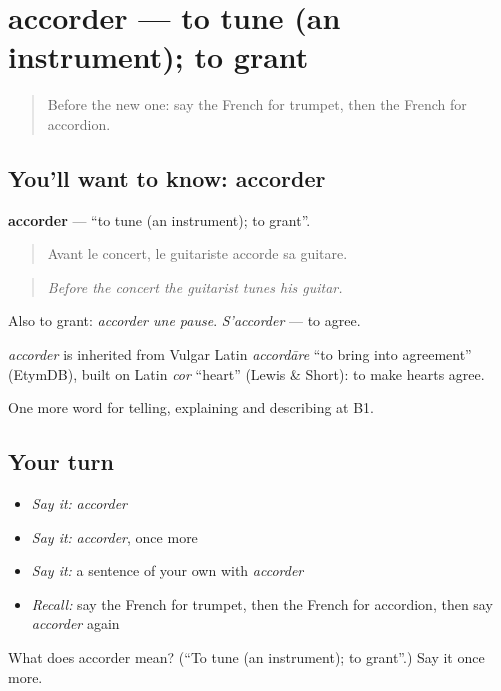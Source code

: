 \section[accorder]{accorder — to tune (an instrument); to grant}

\label{lesson:FR-C511-accorder}



\begin{quote}
Before the new one: say the French for trumpet, then the French for accordion.
\end{quote}

\subsection*{You'll want to know: accorder}
\textbf{accorder} — \textquotedblleft{}to tune (an instrument); to grant\textquotedblright{}.

\begin{quote}
Avant le concert, le guitariste accorde sa guitare.
\end{quote}

\begin{quote}
\emph{Before the concert the guitarist tunes his guitar.}
\end{quote}

Also to grant: \emph{accorder une pause}. \emph{S'accorder} — to agree.

\begin{cousinweb}
\emph{accorder} is inherited from Vulgar Latin \emph{accordāre} \textquotedblleft{}to bring into agreement\textquotedblright{} (EtymDB), built on Latin \emph{cor} \textquotedblleft{}heart\textquotedblright{} (Lewis \& Short): to make hearts agree.
\end{cousinweb}

\begin{grammarlens}[title={What you've built}]
One more word for telling, explaining and describing at B1.
\end{grammarlens}

\subsection*{Your turn}
\begin{itemize}
\raggedright
  \item \emph{Say it:} \emph{accorder}
  \item \emph{Say it:} \emph{accorder}, once more
  \item \emph{Say it:} a sentence of your own with \emph{accorder}
  \item \emph{Recall:} say the French for trumpet, then the French for accordion, then say \emph{accorder} again
\end{itemize}

\begin{tcolorbox}[breakable,colback=teal!4,colframe=teal!35!black,title={Before you move on}]
What does accorder mean? (\textquotedblleft{}To tune (an instrument); to grant\textquotedblright{}.) Say it once more.
\end{tcolorbox}
